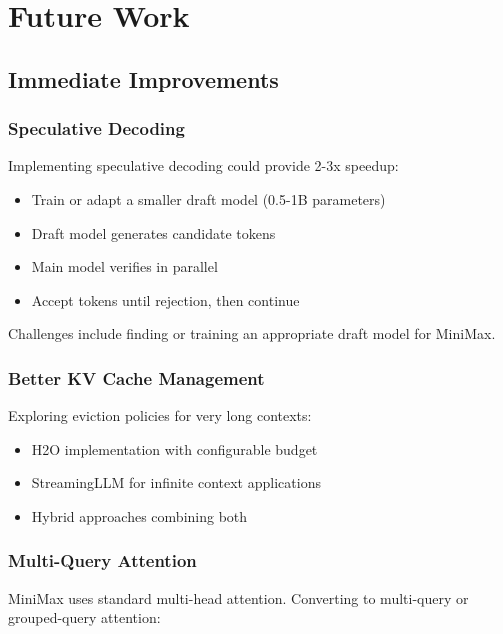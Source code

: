 \section{Future Work}
\label{sec:future_work}

\subsection{Immediate Improvements}

\subsubsection{Speculative Decoding}

Implementing speculative decoding could provide 2-3x speedup:

\begin{itemize}
    \item Train or adapt a smaller draft model (0.5-1B parameters)
    \item Draft model generates candidate tokens
    \item Main model verifies in parallel
    \item Accept tokens until rejection, then continue
\end{itemize}

Challenges include finding or training an appropriate draft model for MiniMax.

\subsubsection{Better KV Cache Management}

Exploring eviction policies for very long contexts:

\begin{itemize}
    \item H2O implementation with configurable budget
    \item StreamingLLM for infinite context applications
    \item Hybrid approaches combining both
\end{itemize}

\subsubsection{Multi-Query Attention}

MiniMax uses standard multi-head attention. Converting to multi-query or grouped-query attention:

